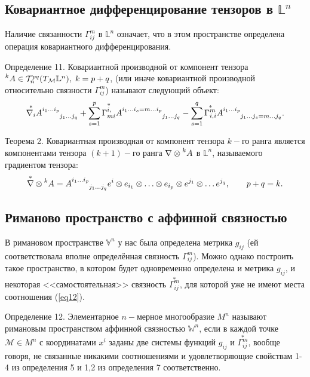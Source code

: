 \documentclass[14pt,a4paper]{extarticle}
\begin{document}
\subsection{Ковариантное дифференцирование тензоров в $\mathbb{L}^n$}
Наличие связанности $\Gamma_{ij}^m$ в $\mathbb{L}^n$ означает, что в этом пространстве определена операция ковариантного дифференцирования.

Определение 11. Ковариантной производной от компонент тензора $\prescript{k}{}{A} \in \mathcal{T}_n^{pq}(T_{\mathcal{M}}\mathbb{L}^n), \; k=p+q$, (или иначе ковариантной производной относительно связности $\Gamma_{ij}^m$) называют следующий объект:
\begin{equation}\label{eq25}
	\overset{*}{\nabla_i}A\indices{^{i_1 \ldots i_p}_{j_1 \ldots j_q}} + \sum\limits_{s = 1}^p \overset{*}{\Gamma_{mi}^{i,}} A\indices{^{i_1 \ldots i_s = m \ldots i_p}_{j_1 \ldots j_q}} - \sum\limits_{s=1}^q \overset{*}{\Gamma_{i,i}^{m}} A\indices{^{i_1 \ldots i_p}_{j_1 \ldots j_s = m \ldots j_q}}.
\end{equation}


Теорема 2. Ковариантная производная от компонент тензора $k-$го ранга является компонентами тензора $(k+1)-$го ранга $\nabla \otimes \prescript{k}{}{A}$ в $\mathbb{L}^n$, называемого градиентом тензора:
\begin{equation}\label{eq26}
	\overset{*}{\nabla} \otimes \prescript{k}{}{A} = A\indices{^{i_1 \ldots i_p}_{j_1 \ldots j_q}} e^i \otimes e_{i_1} \otimes \ldots \otimes e_{i_p} \otimes e^{j_1} \otimes \ldots e^{j_q}, \qquad p+q=k.
\end{equation}

\subsection{Риманово пространство с аффинной связностью}
В римановом пространстве $\mathbb{V}^n$ у нас была определена метрика $g_{ij}$ (ей соответствовала вполне определённая связность $\Gamma_{ij}^m$). Можно однако построить такое пространство, в котором будет одновременно определена и метрика $g_{ij}$, и некоторая <<самостоятельная>> связность  $\overset{*}{\Gamma_{ij}^m}$, для которой уже не имеют места соотношения (\ref{eq12}).

Определение 12. Элементарное $n-$мерное многообразие $M^n$ называют римановым пространством аффинной связностью $\mathbb{W}^n$, если в каждой точке $\mathcal{M} \in M^n$ с координатами $x^i$ заданы две системы функций $g_{ij}$ и $\overset{*}{\Gamma_{ij}^m}$, вообще говоря, не связанные никакими соотношениями и удовлетворяющие свойствам 1-4 из определения 5 и 1,2 из определения 7 соответственно.
\end{document}
